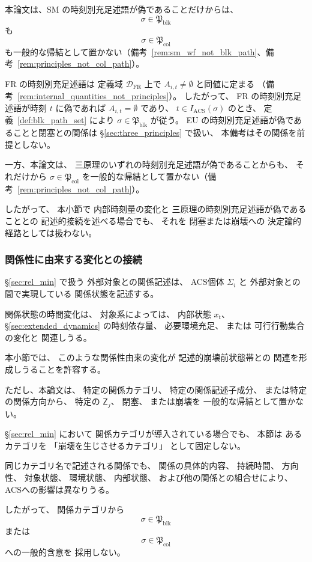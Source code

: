 \begin{remark}[三原理の時刻別充足述語が偽であることと経路集合への帰属]
\label{rem:principle_failure_not_path_membership}
本論文は、SM の時刻別充足述語が偽であることだけからは、
\[
  \sigma\in\mathfrak{P}_{\mathrm{blk}}
\]
も
\[
  \sigma\in\mathfrak{P}_{\mathrm{col}}
\]
も一般的な帰結として置かない（備考~\ref{rem:sm_wf_not_blk_path}、備考~\ref{rem:principles_not_col_path}）。

FR の時刻別充足述語は
定義域 $\mathcal{D}_{\mathrm{FR}}$ 上で
$A_{i,t}\neq\emptyset$ と同値に定まる
（備考~\ref{rem:internal_quantities_not_principles}）。
したがって、
FR の時刻別充足述語が時刻 $t$ に偽であれば
$A_{i,t}=\emptyset$ であり、
$t\in I_{\mathrm{ACS}}(\sigma)$ のとき、
定義~\ref{def:blk_path_set} により
$\sigma\in\mathfrak{P}_{\mathrm{blk}}$ が従う。
EU の時刻別充足述語が偽であることと閉塞との関係は
\S\ref{sec:three_principles} で扱い、
本備考はその関係を前提としない。

一方、本論文は、
三原理のいずれの時刻別充足述語が偽であることからも、
それだけから
$\sigma\in\mathfrak{P}_{\mathrm{col}}$
を一般的な帰結として置かない（備考~\ref{rem:principles_not_col_path}）。

したがって、
本小節で
内部時刻量の変化と
三原理の時刻別充足述語が偽であることとの
記述的接続を述べる場合でも、
それを
閉塞または崩壊への
決定論的経路としては扱わない。
\end{remark}

\subsubsection{関係性に由来する変化との接続}

\begin{remark}[関係記述子と流入傾向]
\label{rem:relational_inflow}
\S\ref{sec:rel_min} で扱う
外部対象との関係記述は、
ACS個体 $\Sigma_i$ と
外部対象との間で実現している
関係状態を記述する。

関係状態の時間変化は、
対象系によっては、
内部状態 $x_t$、
\S\ref{sec:extended_dynamics} の時刻依存量、
必要環境充足、
または
可行行動集合の変化と
関連しうる。

本小節では、
このような関係性由来の変化が
記述的崩壊前状態帯との
関連を形成しうることを許容する。

ただし、本論文は、
特定の関係カテゴリ、
特定の関係記述子成分、
または特定の関係方向から、
特定の
$\mathsf{Z}_j$、
閉塞、
または崩壊を
一般的な帰結として置かない。
\end{remark}

\begin{remark}[関係カテゴリは崩壊原因ラベルではない]
\label{rem:relation_category_not_collapse_cause}
\S\ref{sec:rel_min} において
関係カテゴリが導入されている場合でも、
本節は
あるカテゴリを
「崩壊を生じさせるカテゴリ」
として固定しない。

同じカテゴリ名で記述される関係でも、
関係の具体的内容、
持続時間、
方向性、
対象状態、
環境状態、
内部状態、
および他の関係との組合せにより、
ACSへの影響は異なりうる。

したがって、
関係カテゴリから
\[
  \sigma\in\mathfrak{P}_{\mathrm{blk}}
\]
または
\[
  \sigma\in\mathfrak{P}_{\mathrm{col}}
\]
への一般的含意を
採用しない。
\end{remark}


